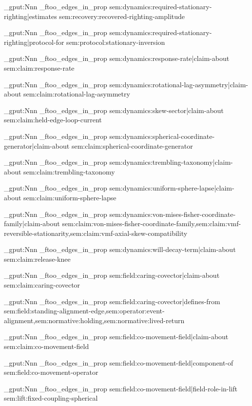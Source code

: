 \prop_gput:Nnn \g_ftoo_edges_in_prop { sem:dynamics:required-stationary-righting|estimates } { sem:recovery:recovered-righting-amplitude }

\prop_gput:Nnn \g_ftoo_edges_in_prop { sem:dynamics:required-stationary-righting|protocol-for } { sem:protocol:stationary-inversion }

\prop_gput:Nnn \g_ftoo_edges_in_prop { sem:dynamics:response-rate|claim-about } { sem:claim:response-rate }

\prop_gput:Nnn \g_ftoo_edges_in_prop { sem:dynamics:rotational-lag-asymmetry|claim-about } { sem:claim:rotational-lag-asymmetry }

\prop_gput:Nnn \g_ftoo_edges_in_prop { sem:dynamics:skew-sector|claim-about } { sem:claim:held-edge-loop-current }

\prop_gput:Nnn \g_ftoo_edges_in_prop { sem:dynamics:spherical-coordinate-generator|claim-about } { sem:claim:spherical-coordinate-generator }

\prop_gput:Nnn \g_ftoo_edges_in_prop { sem:dynamics:trembling-taxonomy|claim-about } { sem:claim:trembling-taxonomy }

\prop_gput:Nnn \g_ftoo_edges_in_prop { sem:dynamics:uniform-sphere-lapse|claim-about } { sem:claim:uniform-sphere-lapse }

\prop_gput:Nnn \g_ftoo_edges_in_prop { sem:dynamics:von-mises-fisher-coordinate-family|claim-about } { sem:claim:von-mises-fisher-coordinate-family,sem:claim:vmf-reversible-stationarity,sem:claim:vmf-axial-skew-compatibility }

\prop_gput:Nnn \g_ftoo_edges_in_prop { sem:dynamics:will-decay-term|claim-about } { sem:claim:release-knee }

\prop_gput:Nnn \g_ftoo_edges_in_prop { sem:field:caring-covector|claim-about } { sem:claim:caring-covector }

\prop_gput:Nnn \g_ftoo_edges_in_prop { sem:field:caring-covector|defines-from } { sem:field:standing-alignment-edge,sem:operator:event-alignment,sem:normative:holding,sem:normative:lived-return }

\prop_gput:Nnn \g_ftoo_edges_in_prop { sem:field:co-movement-field|claim-about } { sem:claim:co-movement-field }

\prop_gput:Nnn \g_ftoo_edges_in_prop { sem:field:co-movement-field|component-of } { sem:field:co-movement-operator }

\prop_gput:Nnn \g_ftoo_edges_in_prop { sem:field:co-movement-field|field-role-in-lift } { sem:lift:fixed-coupling-spherical }

